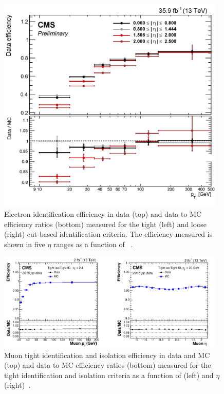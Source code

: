 \begin{figure}[ht]
\centering
\includegraphics[width=0.97\textwidth]{figs/background-estimation/simulationCorrections/electronTightIdEff.pdf}
\caption{
Electron identification efficiency in data (top) and data to MC efficiency ratios (bottom) measured for the tight (left) and loose (right) cut-based identification criteria. The efficiency measured is shown in five $\eta$ ranges as a function of \pT~\cite{CMS-DP-2017-004}.
}
\label{fig:electronIdEff}
\end{figure}

\begin{figure}[ht]
\centering
\includegraphics[width=0.97\textwidth]{figs/background-estimation/simulationCorrections/tightMuonIdIsoEff.pdf}
\caption{
Muon tight identification and isolation efficiency in data and MC (top) and data to MC efficiency ratios (bottom) measured for the tight identification and isolation criteria as a function of \pT (left) and $\eta$ (right)~\cite{Sirunyan:2018fpa}.
}
\label{fig:tightMuonIdEff}
\end{figure}

